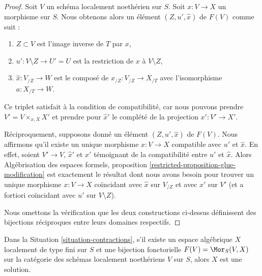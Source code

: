 \begin{proof}
Soit $V$ un schéma localement noethérien sur $S$.
Soit $x : V \to X$ un morphisme sur $S$.
Nous obtenons alors un élément $(Z, u', \hat x)$ de $F(V)$ comme suit :
\begin{enumerate}
\item $Z \subset V$ est l'image inverse de $T$ par $x$,
\item $u' : V \setminus Z \to U' = U$ est la restriction de
$x$ à $V \setminus Z$,
\item $\hat x : V_{/Z} \to W$ est le composé de
$x_{/Z} : V_{/Z} \to X_{/T}$ avec l'isomorphisme $a : X_{/T} \to W$.
\end{enumerate}
Ce triplet satisfait à la condition de compatibilité, car nous
pouvons prendre $V' = V \times_{x, X} X'$ et prendre pour $\hat x'$
le complété de la projection $x' : V' \to X'$.

\medskip\noindent
Réciproquement, supposons donné un élément $(Z, u', \hat x)$ de $F(V)$. Nous affirmons
qu'il existe un unique morphisme $x : V \to X$ compatible avec $u'$ et $\hat x$.
En effet, soient $V' \to V$, $\hat x'$ et $x'$ témoignant de la
compatibilité entre $u'$ et $\hat x$. Alors
Algébrisation des espaces formels, proposition
\ref{restricted-proposition-glue-modification}
est exactement le résultat dont nous avons besoin pour trouver
un unique morphisme $x : V \to X$ coïncidant avec
$\hat x$ sur $V_{/Z}$ et avec $x'$ sur $V'$ (et a fortiori
coïncidant avec $u'$ sur $V \setminus Z$).

\medskip\noindent
Nous omettons la vérification que les deux constructions ci-dessus définissent des
bijections réciproques entre leurs domaines respectifs.
\end{proof}

\begin{lemma}
\label{lemma-functor-is-solution}
Dans la Situation \ref{situation-contractions}, s'il existe un
espace algébrique $X$ localement de type fini sur $S$ et une
bijection fonctorielle $F(V) = \Mor_S(V, X)$ sur la catégorie des
schémas localement noethériens $V$ sur $S$, alors $X$ est une solution.
\end{lemma}

